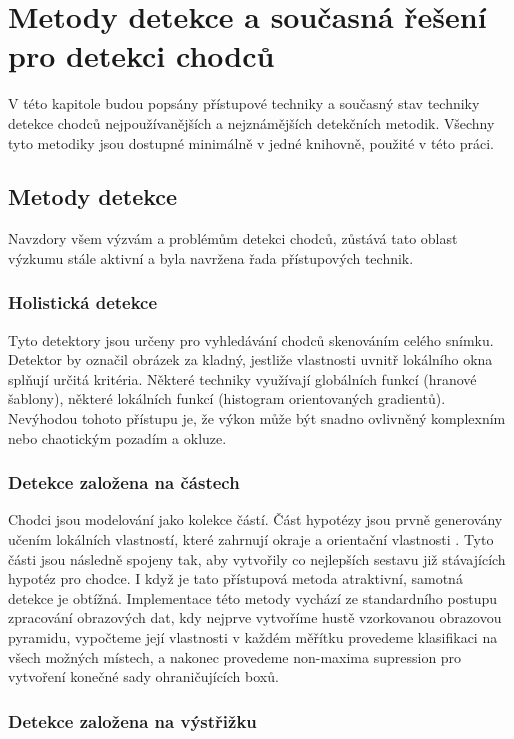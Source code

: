 \section{Metody detekce a současná řešení pro detekci chodců}
V této kapitole budou popsány přístupové techniky a současný stav techniky detekce chodců nejpoužívanějších a nejznámějších detekčních metodik. Všechny tyto metodiky jsou dostupné minimálně v jedné knihovně, použité v této práci.  

\subsection{Metody detekce}
Navzdory všem výzvám a problémům detekci chodců, zůstává tato oblast výzkumu stále aktivní a byla navržena řada přístupových technik.

\subsubsection{Holistická detekce}

Tyto detektory jsou určeny pro vyhledávání chodců skenováním celého snímku. Detektor by označil obrázek za kladný, jestliže vlastnosti uvnitř lokálního okna splňují určitá kritéria. Některé techniky využívají globálních funkcí (hranové šablony\cite{edgeTemplate}), některé lokálních funkcí (histogram orientovaných gradientů\cite{hog:dalal}). Nevýhodou tohoto přístupu je, že výkon může být snadno ovlivněný komplexním nebo chaotickým pozadím a okluze.

\subsubsection{Detekce založena na částech}

Chodci jsou modelování jako kolekce částí. Část hypotézy jsou prvně generovány učením lokálních vlastností, které zahrnují okraje\cite{edgelet} a orientační vlastnosti \cite{orientationFeatures}. Tyto části jsou následně spojeny tak, aby vytvořily co nejlepších sestavu již stávajících hypotéz pro chodce. I když je tato přístupová metoda atraktivní, samotná detekce je obtížná. Implementace této metody vychází ze standardního postupu zpracování obrazových dat, kdy nejprve vytvoříme hustě vzorkovanou obrazovou pyramidu, vypočteme její vlastnosti v každém měřítku provedeme klasifikaci na všech možných místech, a nakonec provedeme non-maxima supression pro vytvoření konečné sady ohraničujících boxů.\cite{partModels} 

\subsubsection{Detekce založena na výstřižku}


